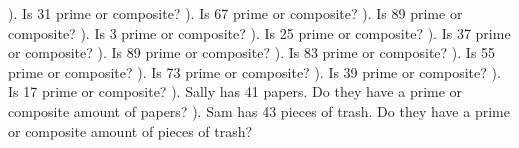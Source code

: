 \documentclass{article}%
\begin{document}
). Is 31 prime or composite?%
\newline%
\newline%
). Is 67 prime or composite?%
\newline%
\newline%
). Is 89 prime or composite?%
\newline%
\newline%
). Is 3 prime or composite?%
\newline%
\newline%
). Is 25 prime or composite?%
\newline%
\newline%
). Is 37 prime or composite?%
\newline%
\newline%
). Is 89 prime or composite?%
\newline%
\newline%
). Is 83 prime or composite?%
\newline%
\newline%
). Is 55 prime or composite?%
\newline%
\newline%
). Is 73 prime or composite?%
\newline%
\newline%
). Is 39 prime or composite?%
\newline%
\newline%
). Is 17 prime or composite?%
\newline%
\newline%
). Sally has 41 papers. Do they have a prime or composite amount of papers?%
\newline%
\newline%
). Sam has 43 pieces of trash. Do they have a prime or composite amount of pieces of trash?%
\newline%
\end{document}
